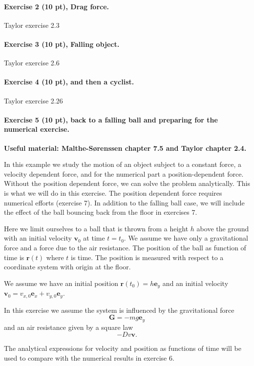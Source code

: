 \documentclass[%
oneside,                 %
final,                   %
10pt]{article}
\begin{document}
\noindent
\paragraph{Exercise 2 (10 pt), Drag force.}
Taylor exercise 2.3

\paragraph{Exercise 3 (10 pt), Falling object.}
Taylor exercise 2.6

\paragraph{Exercise 4 (10 pt), and then a cyclist.}
Taylor exercise 2.26


\paragraph{Exercise 5 (10 pt), back to a falling ball and preparing for the numerical exercise.}
\textbf{Useful material: Malthe-Sørenssen chapter 7.5 and Taylor chapter 2.4.}

In this example we study the motion of an object subject to a constant force, a velocity dependent
force, and for the numerical part a position-dependent force.
Without the position dependent force, we can solve the problem analytically. This is what we will do in this exercise.
The position dependent force requires numerical efforts (exercise 7).
In addition to the  falling ball case, we will include the effect of the ball bouncing back from the floor in exercises 7.


Here we limit ourselves to a ball that is thrown from a height $h$
above the ground with an initial velocity
$\bm{v}_0$ at time $t=t_0$.
We assume we have only a gravitational force and a force due to the air resistance.
The position of the ball as function of time is  $\bm{r}(t)$ where $t$ is time.
 The position is measured with respect to a coordinate system with origin at the floor.

We assume we have an initial position $\bm{r}(t_0)=h\bm{e}_y$ and an initial velocity $\bm{v}_0=v_{x,0}\bm{e}_x+v_{y,0}\bm{e}_y$.

In this exercise we assume the system is influenced by the gravitational force
\[
\bm{G}=-mg\bm{e}_y
\]
and an air resistance given by a square law
\[
-Dv\bm{v}.
\]

The analytical expressions for velocity and position as functions of
time will be used to compare with the numerical results in exercise 6.
\end{document}
